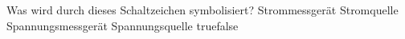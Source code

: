     {Was wird durch dieses Schaltzeichen symbolisiert?}
    {Strommessgerät}
    {Stromquelle}
    {Spannungsmessgerät}
    {Spannungsquelle}
    {true}{false}